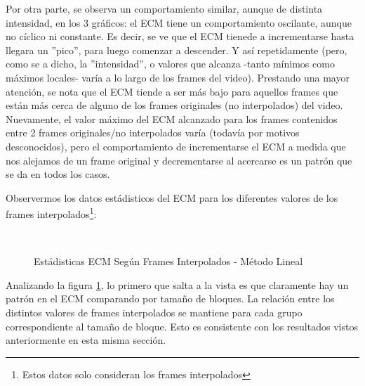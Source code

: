 \par Por otra parte, se observa un comportamiento similar, aunque de distinta
intensidad, en los 3 gr\'aficos: el ECM tiene un comportamiento oscilante,
aunque no c\'iclico ni constante. Es decir, se ve que el ECM tienede a
incrementarse hasta llegara un ''pico'', para luego comenzar a descender. Y
as\'i repetidamente (pero, como se a dicho, la ''intensidad'', o valores que
alcanza -tanto m\'inimos como m\'aximos locales- var\'ia a lo largo de los
frames del video). Prestando una mayor atenci\'on, se nota que el ECM tiende a
ser m\'as bajo para aquellos frames que est\'an m\'as cerca de alguno de los
frames originales (no interpolados) del video. Nuevamente, el valor m\'aximo
del ECM alcanzado para los frames contenidos entre 2 frames originales/no
interpolados var\'ia (todav\'ia por motivos desconocidos), pero el
comportamiento de incrementarse el ECM a medida que nos alejamos de un frame
original y decrementarse al acercarse es un patr\'on que se da en todos los
casos.

\par Observermos los datos est\'adisticos del ECM para los diferentes valores
de los frames interpolados\footnote{Estos datos solo consideran los frames
interpolados}:

\begin{figure}[H]
    \centering
    \\
    \caption{Est\'adisticas ECM Seg\'un Frames Interpolados - M\'etodo Lineal}
    \label{fig:fija-fija_spline-mse_estadisticas}
\end{figure}

\par Analizando la figura \ref{fig:fija-fija_spline-mse_estadisticas}, lo primero
que salta a la vista es que claramente hay un patr\'on en el ECM comparando por
tama\~no de bloques. La relaci\'on entre los distintos valores de frames
interpolados se mantiene para cada grupo correspondiente al tama\~no de bloque.
Esto es consistente con los resultados vistos anteriormente en esta misma
secci\'on.

